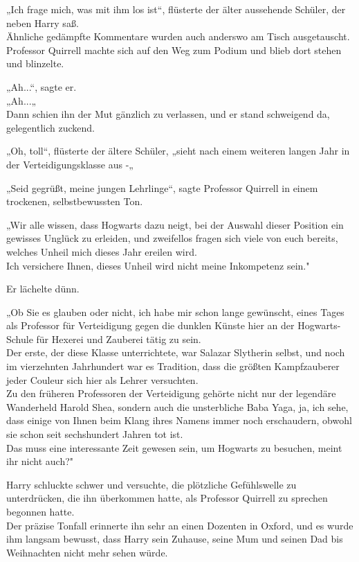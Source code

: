 {„Ich frage mich, was mit ihm los ist“, flüsterte der älter aussehende Schüler, der neben Harry saß.\\ Ähnliche gedämpfte Kommentare wurden auch anderswo am Tisch ausgetauscht. Professor Quirrell machte sich auf den Weg zum Podium und blieb dort stehen und blinzelte.

„Ah...“, sagte er.\\ „Ah...„\\ Dann schien ihn der Mut gänzlich zu verlassen, und er stand schweigend da, gelegentlich zuckend.

„Oh, toll“, flüsterte der ältere Schüler, „sieht nach einem weiteren langen Jahr in der Verteidigungsklasse aus -„

„Seid gegrüßt, meine jungen Lehrlinge“, sagte Professor Quirrell in einem trockenen, selbstbewussten Ton.

„Wir alle wissen, dass Hogwarts dazu neigt, bei der Auswahl dieser Position ein gewisses Unglück zu erleiden, und zweifellos fragen sich viele von euch bereits, welches Unheil mich dieses Jahr ereilen wird.\\ Ich versichere Ihnen, dieses Unheil wird nicht meine Inkompetenz sein."

Er lächelte dünn.

„Ob Sie es glauben oder nicht, ich habe mir schon lange gewünscht, eines Tages als Professor für Verteidigung gegen die dunklen Künste hier an der Hogwarts-Schule für Hexerei und Zauberei tätig zu sein.\\ Der erste, der diese Klasse unterrichtete, war Salazar Slytherin selbst, und noch im vierzehnten Jahrhundert war es Tradition, dass die größten Kampfzauberer jeder Couleur sich hier als Lehrer versuchten.\\ Zu den früheren Professoren der Verteidigung gehörte nicht nur der legendäre Wanderheld Harold Shea, sondern auch die unsterbliche Baba Yaga, ja, ich sehe, dass einige von Ihnen beim Klang ihres Namens immer noch erschaudern, obwohl sie schon seit sechshundert Jahren tot ist.\\ Das muss eine interessante Zeit gewesen sein, um Hogwarts zu besuchen, meint ihr nicht auch?"

Harry schluckte schwer und versuchte, die plötzliche Gefühlswelle zu unterdrücken, die ihn überkommen hatte, als Professor Quirrell zu sprechen begonnen hatte.\\ Der präzise Tonfall erinnerte ihn sehr an einen Dozenten in Oxford, und es wurde ihm langsam bewusst, dass Harry sein Zuhause, seine Mum und seinen Dad bis Weihnachten nicht mehr sehen würde.

}
